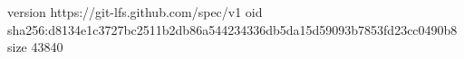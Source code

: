 version https://git-lfs.github.com/spec/v1
oid sha256:d8134e1c3727bc2511b2db86a544234336db5da15d59093b7853fd23cc0490b8
size 43840
